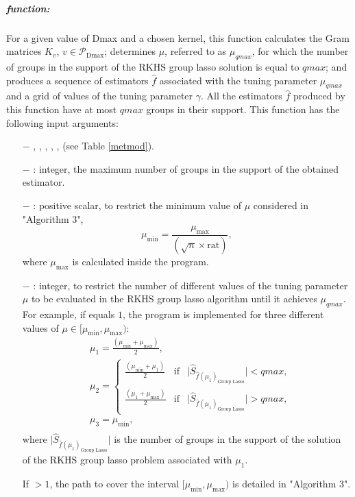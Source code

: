 \subparagraph{ function:} For a given value of Dmax and a chosen kernel, this function calculates the Gram matrices $K_v$, $v\in\mathcal{P}_{\text{Dmax}}$; determines $\mu$, referred to as $\mu_{qmax}$, for which the number of groups in the support of the RKHS group lasso solution is equal to $qmax$; and produces a sequence of estimators $\widehat{f}$ associated with the tuning parameter $\mu_{qmax}$ and a grid of values of the tuning parameter $\gamma$. All the estimators $\widehat{f}$ produced by this function have at most $qmax$ groups in their support.
This function has the following input arguments: 
\begin{itemize}
\item[$-$] , , , , ,  (see Table \ref{metmod}).
\item[$-$] : integer, the maximum number of groups in the support of the obtained estimator.
\item[$-$] : positive scalar, to restrict the minimum value of $\mu$ considered in "Algorithm 3", $$\mu_{\text{min}}=\frac{\mu_{\text{max}}}{(\sqrt{n}\times\text{rat})},$$ 
where $\mu_{\text{max}}$ is calculated inside the program.
\item[$-$] : integer, to restrict the number of different values of the tuning parameter $\mu$ to be evaluated in the RKHS group lasso algorithm until it achieves $\mu_{qmax}$. For example, if  equals $1$, the program is implemented for three different values of $\mu\in[\mu_{\text{min}},\mu_{\text{max}})$: 
\begin{align*}
&\mu_{1}=\frac{(\mu_{\text{min}}+\mu_{\text{max}})}{2},\\
&\mu_{2}=\left\{ \begin{array}{rcl}
         \frac{(\mu_{\text{min}}+\mu_{1})}{2} & \mbox{if}& \vert \widehat{S}_{\widehat{f}(\mu_1)_{\text{Group Lasso}}}\vert <qmax,\\ 
         \frac{(\mu_{1}+\mu_{\text{max}})}{2}   & \mbox{if} & \vert \widehat{S}_{\widehat{f}(\mu_1)_{\text{Group Lasso}}}\vert >qmax, 
                \end{array}\right.\\
&  \mu_{3}=\mu_{\text{min}},\\              
\end{align*}
where $\vert \widehat{S}_{\widehat{f}(\mu_1)_{\text{Group Lasso}}}\vert$ is the number of groups in the support of the solution of the RKHS group lasso problem associated with $\mu_{1}$.

If  $>1$, the path to cover the interval $[\mu_{\text{min}},\mu_{\text{max}})$ is detailed in "Algorithm 3".  
\end{itemize}
